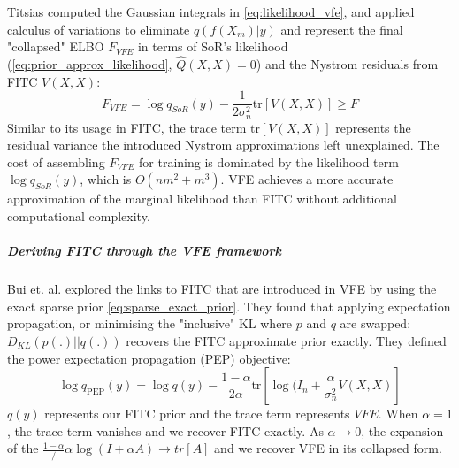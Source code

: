 Titsias \cite{vfe} computed the Gaussian integrals in \ref{eq:likelihood_vfe}, and applied calculus of variations to eliminate $q(f(X_m) | y)$ and represent the final "collapsed" ELBO $F_{VFE}$ in terms of SoR's likelihood (\ref{eq:prior_approx_likelihood}, $\hat{Q}(X, X) = 0$) and the Nystrom residuals from FITC $V(X, X)$:
\begin{equation*}
    F_{VFE} = \log q_{SoR}(y) - \frac{1}{2\sigma_n^2} \text{tr}[V(X, X)] \geq F
\end{equation*}
Similar to its usage in FITC, the trace term $\text{tr}[V(X, X)]$ represents the residual variance the introduced Nystrom approximations left unexplained. The cost of assembling $F_{VFE}$ for training is dominated by the likelihood term $\log q_{SoR}(y)$, which is $O(nm^2 + m^3)$. VFE achieves a more accurate approximation of the marginal likelihood than FITC without additional computational complexity.

\subparagraph{Deriving FITC through the VFE framework}
Bui et. al. \cite{fitc-vfe-unifier} explored the links to FITC that are introduced in VFE by using the exact sparse prior \ref{eq:sparse_exact_prior}. They found that applying expectation propagation, or minimising the "inclusive" KL where $p$ and $q$ are swapped: $D_{KL}(p(.) || q(.))$ recovers the FITC approximate prior exactly. They defined the power expectation propagation (PEP) objective:
\begin{equation*}
    \log q_{\text{PEP}}(y) = \log q(y) - \frac{1 - \alpha}{2\alpha} \text{tr}\left[ \log(I_n + \frac{\alpha}{\sigma_n^2} V(X, X) \right]
\end{equation*}
$q(y)$ represents our FITC prior and the trace term represents $VFE$. When $\alpha = 1$, the trace term vanishes and we recover FITC exactly. As $\alpha \to 0$, the expansion of the $\frac{1-\alpha}/{\alpha} \log(I + \alpha A) \to tr[A]$ and we recover VFE in its collapsed form. 

